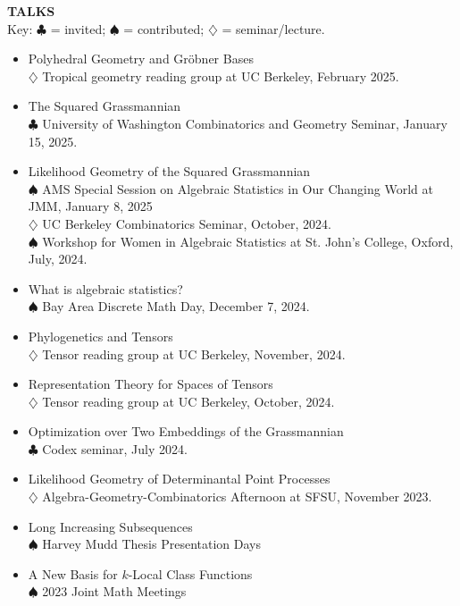\documentclass[11pt]{article}
\newcommand{\hdr}[1]{\textcolor{blue(ryb)}{\textbf{#1}}}
\begin{document}
\hdr{TALKS}\\
Key: $\clubsuit$ = invited; $\spadesuit$ = contributed; $\diamondsuit$ = seminar/lecture.
\begin{itemize}
\item Polyhedral Geometry and Gr\"{o}bner Bases\\
  $\diamondsuit$ Tropical geometry reading group at UC Berkeley, February 2025. 
\item The Squared Grassmannian\\
  $\clubsuit$ University of Washington Combinatorics and Geometry Seminar, January 15, 2025.
\item Likelihood Geometry of the Squared Grassmannian\\
  $\spadesuit$ AMS Special Session on Algebraic Statistics in Our Changing World at JMM, January 8, 2025\\
  $\diamondsuit$ UC Berkeley Combinatorics Seminar, October, 2024.\\
  $\spadesuit$ Workshop for Women in Algebraic Statistics at St. John's College, Oxford, July, 2024. 
\item What is algebraic statistics?\\
  $\spadesuit$ Bay Area Discrete Math Day, December 7, 2024. 
\item Phylogenetics and Tensors\\
  $\diamondsuit$ Tensor reading group at UC Berkeley, November, 2024. 
\item Representation Theory for Spaces of Tensors\\
  $\diamondsuit$ Tensor reading group at UC Berkeley, October, 2024. 
\item Optimization over Two Embeddings of the Grassmannian\\
  $\clubsuit$ Codex seminar, July 2024. 
\item Likelihood Geometry of Determinantal Point Processes\\
  $\diamondsuit$ Algebra-Geometry-Combinatorics Afternoon at SFSU, November 2023.
\item Long Increasing Subsequences\\
  $\spadesuit$ Harvey Mudd Thesis Presentation Days
\item A New Basis for $k$-Local Class Functions\\
  $\spadesuit$ 2023 Joint Math Meetings
\end{itemize}

\bigskip
\end{document}

